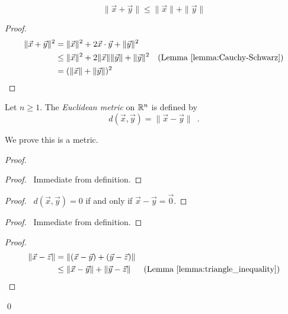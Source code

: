 \begin{lemma}
    \label{lemma:triangle_inequality}
    \[ \| \vec{x} + \vec{y} \| \leq \| \vec{x} \| + \| \vec{y} \| \]
\end{lemma}

\begin{proof}
    \pf
    \begin{align*}
        \| \vec{x} + \vec{y} \|^2 & = \| \vec{x} \|^2 + 2 \vec{x} \cdot \vec{y} + \| \vec{y} \|^2 \\
        & \leq \| \vec{x} \|^2 + 2 \| \vec{x} \| \| \vec{y} \| + \| \vec{y} \|^2 & (\text{Lemma \ref{lemma:Cauchy-Schwarz}}) \\
        & = (\| \vec{x} \| + \| \vec{y} \|)^2 & \qed
    \end{align*}
\end{proof}

\begin{definition}
    Let $n \geq 1$. The \emph{Euclidean metric} on $\RR^n$ is defined by
    \[ d(\vec{x}, \vec{y}) = \| \vec{x} - \vec{y} \| \enspace . \]
\end{definition}

We prove this is a metric.

\begin{proof}
    \begin{proof}
        \pf\ Immediate from definition.
    \end{proof}
    \begin{proof}
        \pf\ $d(\vec{x}, \vec{y}) = 0$ if and only if $\vec{x} - \vec{y} = \vec{0}$.
    \end{proof}
    \begin{proof}
        \pf\ Immediate from definition.
    \end{proof}
    \begin{proof}
        \pf
        \begin{align*}
            \| \vec{x} - \vec{z} \| & = \| (\vec{x} - \vec{y}) + (\vec{y} - \vec{z}) \| \\
            & \leq \| \vec{x} - \vec{y} \| + \| \vec{y} - \vec{z} \| & (\text{Lemma \ref{lemma:triangle_inequality}})
        \end{align*}
    \end{proof}
    \qed
\end{proof}

